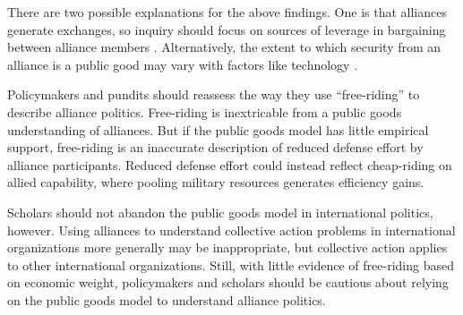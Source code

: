 \documentclass[12pt]{article}
\begin{document}
There are two possible explanations for the above findings. 
One is that alliances generate exchanges, so inquiry should focus on sources of leverage in bargaining between alliance members \citep{Morrow1991, Norrlof2010, Brooksetal2013, Johnson2015, Kim2016}. 
Alternatively, the extent to which security from an alliance is a public good may vary with factors like technology \citep{SandlerHartley2001}. 


Policymakers and pundits should reassess the way they use ``free-riding'' to describe alliance politics. 
Free-riding is inextricable from a public goods understanding of alliances.
But if the public goods model has little empirical support, free-riding is an inaccurate description of reduced defense effort by alliance participants.  
Reduced defense effort could instead reflect cheap-riding on allied capability, where pooling military resources generates efficiency gains. 


Scholars should not abandon the public goods model in international politics, however.   
Using alliances to understand collective action problems in international organizations more generally \citet[pg. 266-7]{OlsonZeckhauser1966} may be inappropriate, but collective action applies to other international organizations. 
Still, with little evidence of free-riding based on economic weight, policymakers and scholars should be cautious about relying on the public goods model to understand alliance politics.  



\singlespace


 
\end{document}
